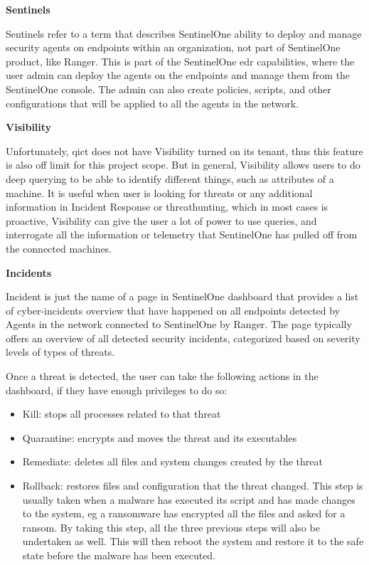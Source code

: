 
\textbf{Sentinels}

Sentinels refer to a term that describes SentinelOne ability to deploy and manage security agents on endpoints within an
organization, not part of SentinelOne product, like Ranger. This is part of the SentinelOne \acrshort{edr} capabilities,
where the user admin can deploy the agents on the endpoints and manage them from the SentinelOne console. The admin can
also create policies, scripts, and other configurations that will be applied to all the agents in the network.

\textbf{Visibility}

Unfortunately, \acrshort{qict} does not have Visibility turned on its tenant, thus this feature is also off limit for this project
scope. But in general, Visibility allows users to do deep querying to be able to identify different things, such as attributes of
a machine. It is useful when user is looking for threats or any additional information in Incident Response or \gls{threathunting},
which in most cases is proactive, Visibility can give the user a lot of power to use queries, and interrogate all the information
or telemetry that SentinelOne has pulled off from the connected machines.

\textbf{Incidents}

Incident is just the name of a page in SentinelOne dashboard that provides a list of cyber-incidents overview that have happened on all
endpoints detected by Agents in the network connected to SentinelOne by Ranger. The page typically offers an overview of all detected
security incidents, categorized based on severity levels of types of threats.

Once a threat is detected, the user can take the following actions in the dashboard, if they have enough privileges
to do so:
\begin{itemize}
      \item Kill: stops all processes related to that threat
      \item Quarantine: encrypts and moves the threat and its executables
      \item Remediate: deletes all files and system changes created by the threat
      \item Rollback: restores files and configuration that the threat changed. This step is usually taken when a malware has
            executed its script and has made changes to the system, \acrshort{eg} a ransomware has encrypted all the files and
            asked for a ransom. By taking this step, all the three previous steps will also be undertaken as well. This will
            then reboot the system and restore it to the safe state before the malware has been executed.
\end{itemize}


